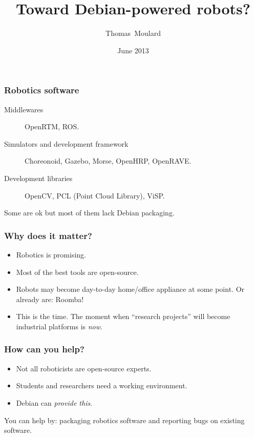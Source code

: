 \documentclass[14pt,utf8,hyperref={pdfpagelabels=false}]{beamer}
\title{Toward Debian-powered robots?}
\author[T\.~Moulard]{Thomas~Moulard}
\date{June 2013}
\begin{document}
{
  \begin{frame}[plain]
    \titlepage
  \end{frame}
}

%

\begin{slideDecision}
  \frametitle{Robotics software}

  \begin{description}
    \item[Middlewares] OpenRTM, ROS.
    \item[Simulators and development framework] Choreonoid, Gazebo,
      Morse, OpenHRP, OpenRAVE.
    \item[Development libraries] OpenCV, PCL (Point Cloud Library), ViSP.
  \end{description}

  Some are ok but most of them lack Debian packaging.

\end{slideDecision}


\begin{slideDecision}
  \frametitle{Why does it matter?}

  \begin{itemize}
    \item Robotics is promising.
    \item Most of the best tools are open-source.
    \item Robots may become day-to-day home/office appliance at some
      point. Or already are: Roomba!
    \item This is the time. The moment when ``research projects'' will
      become industrial platforms is \emph{now}.
  \end{itemize}

\end{slideDecision}

\begin{slideDecision}
  \frametitle{How can you help?}

  \begin{itemize}
    \item Not all roboticists are open-source experts.
    \item Students and researchers need a working environment.
    \item Debian can \emph{provide this}.
  \end{itemize}

  \vspace{1cm}

  You can help by: packaging robotics software and reporting
  bugs on existing software.

\end{slideDecision}

\end{document}

